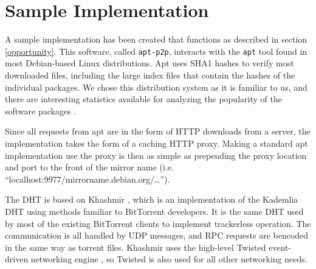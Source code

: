 \documentclass[conference]{IEEEtran}
\begin{document}
% 


\section{Sample Implementation}
\label{implementation}

A sample implementation has been created that functions as described
in section \ref{opportunity}. This software, called
\texttt{apt-p2p}, interacts with the \texttt{apt} tool found in most
Debian-based Linux distributions. Apt uses SHA1 hashes to
verify most downloaded files, including the large index files that
contain the hashes of the individual packages. We chose this
distribution system as it is familiar to us, and there are
interesting statistics available for analyzing the popularity of the
software packages \cite{popcon}.

Since all requests from apt are in the form of HTTP downloads from a
server, the implementation takes the form of a caching HTTP proxy.
Making a standard apt implementation use the proxy is then as simple
as prepending the proxy location and port to the front of the mirror
name (i.e. ``localhost:9977/mirrorname.debian.org/\ldots'').

The DHT is based on Khashmir \cite{khashmir}, which is an implementation of the
Kademlia DHT \cite{kademlia} using methods familiar to BitTorrent
developers. It is the same DHT used by most of the existing
BitTorrent clients to implement trackerless operation. The
communication is all handled by UDP messages, and RPC requests are
bencoded in the same way as torrent files. Khashmir uses the high-level
Twisted event-driven networking engine \cite{twisted}, so Twisted is also used for
all other networking needs.
\end{document}
